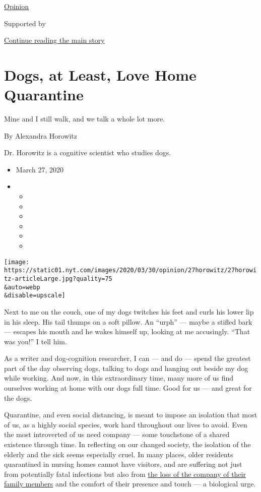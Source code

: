\href{/section/opinion}{Opinion}

Supported by

\protect\hyperlink{after-sponsor}{Continue reading the main story}

\hypertarget{dogs-at-least-love-home-quarantine}{%
\section{Dogs, at Least, Love Home
Quarantine}\label{dogs-at-least-love-home-quarantine}}

Mine and I still walk, and we talk a whole lot more.

By Alexandra Horowitz

Dr. Horowitz is a cognitive scientist who studies dogs.

\begin{itemize}
\item
  March 27, 2020
\item
  \begin{itemize}
  \item
  \item
  \item
  \item
  \item
  \item
  \end{itemize}
\end{itemize}

\texttt{[image: https://static01.nyt.com/images/2020/03/30/opinion/27horowitz/27horowitz-articleLarge.jpg?quality=75\\\&auto=webp\\\&disable=upscale]}

Next to me on the couch, one of my dogs twitches his feet and curls his
lower lip in his sleep. His tail thumps on a soft pillow. An ``urph''
--- maybe a stifled bark --- escapes his mouth and he wakes himself up,
looking at me accusingly. ``That was you!'' I tell him.

As a writer and dog-cognition researcher, I can --- and do --- spend the
greatest part of the day observing dogs, talking to dogs and hanging out
beside my dog while working. And now, in this extraordinary time, many
more of us find ourselves working at home with our dogs full time. Good
for us --- and great for the dogs.

Quarantine, and even social distancing, is meant to impose an isolation
that most of us, as a highly social species, work hard throughout our
lives to avoid. Even the most introverted of us need company --- some
touchstone of a shared existence through time. In reflecting on our
changed society, the isolation of the elderly and the sick seems
especially cruel. In many places, older residents quarantined in nursing
homes cannot have visitors, and are suffering not just from potentially
fatal infections but also from
\href{https://www.npr.org/2020/03/07/813113958/opinion-1-unfathomable-toll-of-the-coronavirus-outbreak-dying-alone}{the
loss of the company of their family members} and the comfort of their
presence and touch --- a biological urge.

